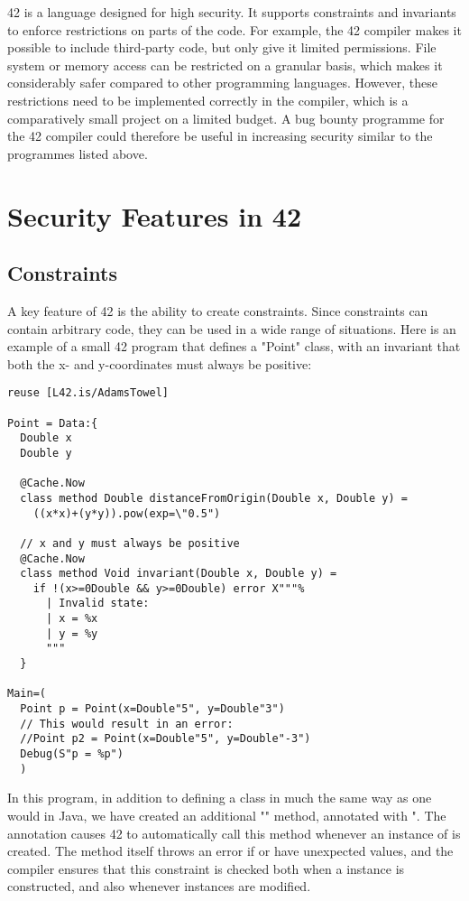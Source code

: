 42 is a language designed for high security. It supports constraints and invariants to enforce restrictions on parts of the code. For example, the 42 compiler makes it possible to include third-party code, but only give it limited permissions. File system or memory access can be restricted on a granular basis, which makes it considerably safer compared to other programming languages. However, these restrictions need to be implemented correctly in the compiler, which is a comparatively small project on a limited budget. A bug bounty programme for the 42 compiler could therefore be useful in increasing security similar to the programmes listed above.

\chapter{Security Features in 42}\label{C:sec}

\section{Constraints}

A key feature of 42 is the ability to create constraints. Since constraints can contain arbitrary code, they can be used in a wide range of situations. Here is an example of a small 42 program that defines a "Point" class, with an invariant that both the x- and y-coordinates must always be positive:

\begin{lstlisting}[caption=Simple Constraint]
reuse [L42.is/AdamsTowel]

Point = Data:{
  Double x
  Double y

  @Cache.Now
  class method Double distanceFromOrigin(Double x, Double y) = 
    ((x*x)+(y*y)).pow(exp=\"0.5")

  // x and y must always be positive
  @Cache.Now
  class method Void invariant(Double x, Double y) = 
    if !(x>=0Double && y>=0Double) error X"""%
      | Invalid state:
      | x = %x
      | y = %y
      """
  }

Main=(
  Point p = Point(x=Double"5", y=Double"3")
  // This would result in an error:
  //Point p2 = Point(x=Double"5", y=Double"-3")
  Debug(S"p = %p")
  )
\end{lstlisting}

In this program, in addition to defining a  class in much the same way as one would in Java, we have created an additional "" method, annotated with ". The annotation causes 42 to automatically call this method whenever an instance of  is created. The method itself throws an error if  or  have unexpected values, and the compiler ensures that this constraint is checked both when a  instance is constructed, and also whenever instances are modified.

